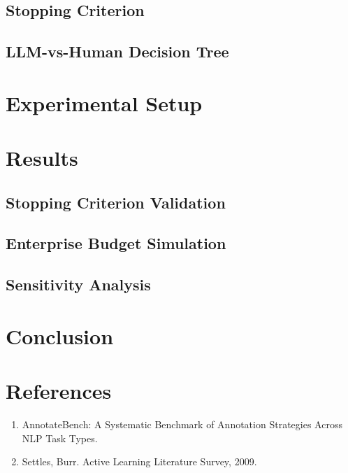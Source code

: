 \documentclass{article}
\begin{document}
\subsection{Stopping Criterion}

\subsection{LLM-vs-Human Decision Tree}

\section{Experimental Setup}

\section{Results}

\subsection{Stopping Criterion Validation}
\subsection{Enterprise Budget Simulation}
\subsection{Sensitivity Analysis}

\section{Conclusion}

\section*{References}
\small
\begin{enumerate}
    \item [T2a] AnnotateBench: A Systematic Benchmark of Annotation Strategies Across NLP Task Types.
    \item Settles, Burr. Active Learning Literature Survey, 2009.
\end{enumerate}
\end{document}
